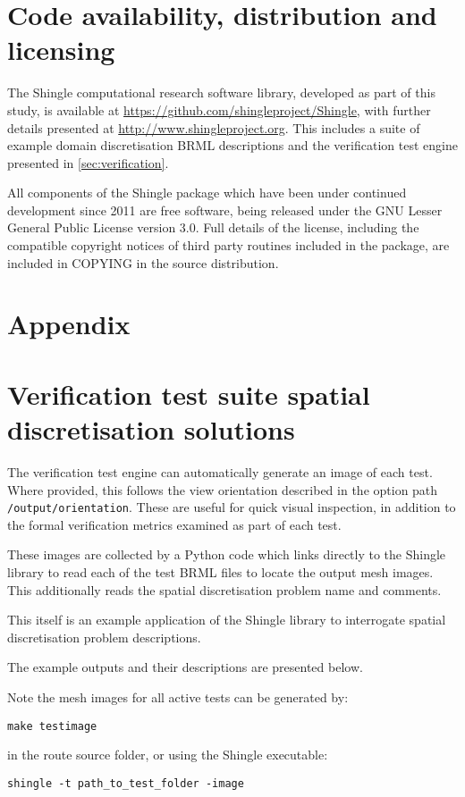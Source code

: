 \documentclass[a4paper, 10pt]{book}
\providecommand{\shingle}{Shingle\xspace}
\providecommand{\brml}{BRML\xspace}
\begin{document}
\chapter{Code availability, distribution and licensing}
\label{sec:distribution}
%
%
The \shingle computational research software library, developed as part of this study, is 
available at \url{https://github.com/shingleproject/Shingle},
with further details presented at
\url{http://www.shingleproject.org}.
%
This includes a suite of example domain discretisation \brml descriptions and the verification test engine presented in \cref{sec:verification}.

All components of the \shingle package
which have been under continued development since 2011
are free software, being released under the GNU Lesser General Public License version 3.0. 
%
Full details of the license, including the compatible copyright notices of third party routines included in the package, are included in COPYING in the source distribution.


\chapter{Appendix}




\chapter{Verification test suite spatial discretisation solutions}

The verification test engine can automatically generate an image of each test.
Where provided, this follows the view orientation described in the option path \verb+/output/orientation+.
These are useful for quick visual inspection, in addition to the formal verification metrics examined as part of each test.

These images are collected by a Python code which links directly to the \shingle library to read each of 
the test \brml files to locate the output mesh images.
This additionally reads the spatial discretisation problem name and comments.

This itself is an example application of the \shingle library to interrogate spatial discretisation problem descriptions.

The example outputs and their descriptions are presented below.

\noindent
Note the mesh images for all active tests can be generated by:
\begin{verbatim}
make testimage
\end{verbatim}
in the route source folder, or using the \shingle executable:
\begin{verbatim}
shingle -t path_to_test_folder -image
\end{verbatim}






\cleardoublepage

\end{document}
